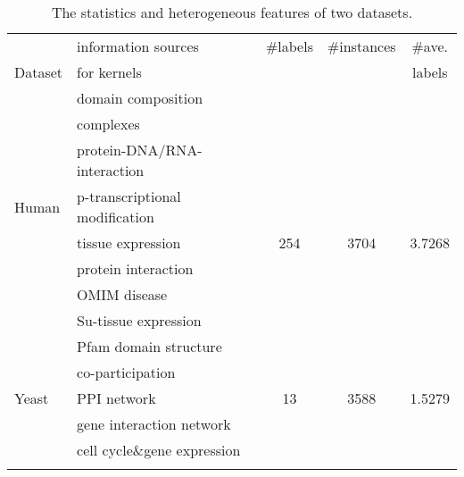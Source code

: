 \documentclass[a4paper]{article}
\begin{document}
\begin{table}[!t] \footnotesize
\center
\begin{tabular}{@{}ll@{}ccc@{}}
\Xhline{2\arrayrulewidth} 
               & information sources                 & \#labels    & \#instances  & \#ave. \\
Dataset        & for kernels                         &             &              & labels     \\ 
\Xhline{2\arrayrulewidth}                                              
               &  \scriptsize{domain composition}                &            &              &              \\
               &  \scriptsize{complexes}                         &            &              &              \\ 
               &  \scriptsize{protein-DNA/RNA-interaction}       &            &              &              \\
\textsf{Human} &  \scriptsize{p-transcriptional modification}    &            &              &              \\
               &  \scriptsize{tissue expression}                 &  254       &  3704        &  3.7268      \\
               &  \scriptsize{protein interaction}               &            &              &              \\
               &  \scriptsize{OMIM disease}                      &            &              &              \\
               &  \scriptsize{Su-tissue expression}                &            &              &              \\
\Xhline{2\arrayrulewidth}
               & \scriptsize{Pfam domain structure}              &            &              &              \\
               & \scriptsize{co-participation}                   &            &              &              \\
\textsf{Yeast} & \scriptsize{PPI network}                        &  13        &  3588        &   1.5279     \\
               & \scriptsize{gene interaction network}           &            &              &              \\
               & \scriptsize{cell cycle\&gene expression}        &            &              &              \\

\Xhline{2\arrayrulewidth}
\end{tabular}
\normalsize
\caption{The statistics and heterogeneous features of two datasets. }
\label{tab:bio_features}
\end{table}
\end{document}
